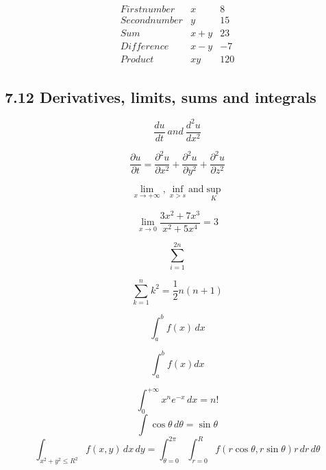 \documentclass{article} %
\begin{document}

\[
\begin{array}{lcr}
    First number & x & 8 \\
    Second number & y & 15 \\
    Sum & x + y & 23 \\
    Difference & x - y & -7 \\
    Product & xy & 120 \end{array}
\]

\subsection*{7.12 Derivatives, limits, sums and integrals}


\[
\frac{du}{dt}~and~\frac{d^2 u}{dx^2}
\]


\[
\frac{\partial u}{\partial t}
= \frac{\partial^2 u}{\partial x^2}
+ \frac{\partial^2 u}{\partial y^2}
+ \frac{\partial^2 u}{\partial z^2}
\]


\[
\lim_{x \to + \infty}, \inf_{x>s} \mbox{and} \sup_K
\]


\[
\lim_{x \to 0} \frac{3x^2 + 7x^3}{x^2 + 5x^4}=3
\]


\[
\sum_{i=1}^{2n}
\]


\[
\sum_{k=1}^n k^2 = \frac{1}{2} n (n+1)
\]


\[
\int_a^b f(x)\,dx
\]

\[
\int_a^b f(x)dx %
\]



\[
\int_0^{+\infty} x^n e^{-x} \,dx = n!
\]
\[
\int \cos \theta \,d\theta = \sin \theta
\]
\[
\int_{x^2 + y^2 \leq R^2} f(x,y) \,dx\,dy
= \int_{\theta=0}^{2\pi} \int_{r=0}^R
f(r\cos\theta,r\sin\theta) r\,dr\,d\theta
\]


\end{document}
